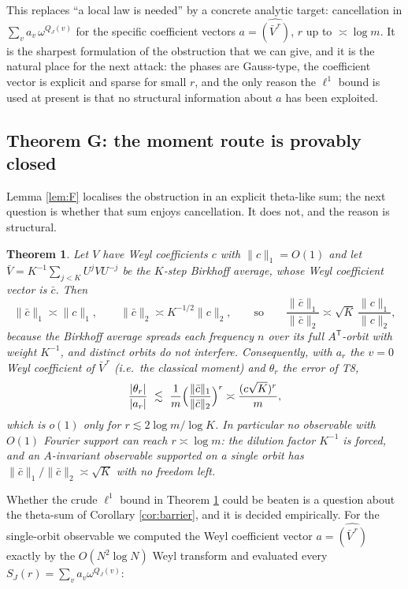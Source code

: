\documentclass[11pt,reqno]{amsart}
\newtheorem{theorem}{Theorem}[section]
\theoremstyle{definition}
\begin{document}
This replaces ``a local law is needed'' by a concrete analytic target: cancellation
in $\sum_v a_v\,\omega^{Q_J(v)}$ for the specific coefficient vectors
$a=\widehat{(\bar V^{\,r})}$, $r$ up to $\asymp\log m$. It is the sharpest
formulation of the obstruction that we can give, and it is the natural place for
the next attack: the phases are Gauss-type, the coefficient vector is explicit
and sparse for small $r$, and the only reason the $\ell^1$ bound is used at
present is that no structural information about $a$ has been exploited.

\subsection{Theorem G: the moment route is provably closed}\label{sub:thmG}

Lemma \ref{lem:F} localises the obstruction in an explicit theta-like sum; the
next question is whether that sum enjoys cancellation. It does not, and the
reason is structural.

\begin{theorem}\label{thm:G}
Let $V$ have Weyl coefficients $c$ with $\|c\|_1=O(1)$ and let
$\bar V=K^{-1}\sum_{j<K}U^jVU^{-j}$ be the $K$-step Birkhoff average, whose Weyl
coefficient vector is $\bar c$. Then
\[
  \|\bar c\|_1\asymp\|c\|_1,\qquad
  \|\bar c\|_2\asymp K^{-1/2}\|c\|_2,\qquad\text{so}\qquad
  \frac{\|\bar c\|_1}{\|\bar c\|_2}\asymp\sqrt K\,\frac{\|c\|_1}{\|c\|_2},
\]
because the Birkhoff average spreads each frequency $n$ over its full
$A^{\mathsf T}$-orbit with weight $K^{-1}$, and distinct orbits do not interfere.
Consequently, with $a_r$ the $v=0$ Weyl coefficient of $\bar V^{\,r}$ (i.e.\ the
classical moment) and $\theta_r$ the error of T8,
\[
  \frac{|\theta_r|}{|a_r|}\ \lesssim\ \frac{1}{m}
   \Bigl(\frac{\|\bar c\|_1}{\|\bar c\|_2}\Bigr)^{r}
   \asymp\frac{(c\sqrt K)^r}{m},
\]
which is $o(1)$ only for $r\lesssim 2\log m/\log K$. In particular no observable
with $O(1)$ Fourier support can reach $r\asymp\log m$: the dilution factor
$K^{-1}$ is forced, and an $A$-invariant observable supported on a single orbit has
$\|\bar c\|_1/\|\bar c\|_2\asymp\sqrt K$ with no freedom left.
\end{theorem}


Whether the crude $\ell^1$ bound in Theorem \ref{thm:G} could be beaten is a
question about the theta-sum of Corollary \ref{cor:barrier}, and it is decided
empirically. For the single-orbit observable we computed the Weyl coefficient
vector $a=\widehat{(\bar V^{\,r})}$ exactly by the $O(N^2\log N)$ Weyl transform
and evaluated every $S_J(r)=\sum_va_v\omega^{Q_J(v)}$:
\end{document}

